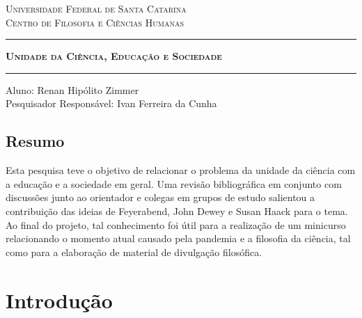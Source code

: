 \documentclass[12pt]{report}
\begin{document}
	
	\begin{center}
		\vspace*{-3cm}
		\textsc{Universidade Federal de Santa Catarina} \\
		\textsc{Centro de Filosofia e Ciências Humanas}
		
		\vspace{1cm}
		\rule{411pt}{1.3pt}
		\vspace{0.2cm}
		
		\Large \textbf{\textsc{Unidade da Ciência, Educação e Sociedade}}
		
		\rule{411pt}{1.3pt}
		\vspace{1cm}
		
		Aluno: Renan Hipólito Zimmer\\
		\vspace{0.5cm}
		Pesquisador Responsável: Ivan Ferreira da Cunha
		
		\vspace{1cm}
	\end{center}	
	
	\vspace{-0.5cm}
	\section*{Resumo}
		Esta pesquisa teve o objetivo de relacionar o problema da unidade da ciência com a educação e a sociedade em geral.
		Uma revisão bibliográfica em conjunto com discussões junto ao orientador e colegas em grupos de estudo salientou a contribuição das ideias de Feyerabend, John Dewey e Susan Haack para o tema.
		Ao final do projeto, tal conhecimento foi útil para a realização de um minicurso relacionando o momento atual causado pela pandemia e a filosofia da ciência, tal como para a elaboração de material de divulgação filosófica.
		
	\newpage
	\vspace*{-3cm}
	\onehalfspacing
	\chapter*{Introdução}
	
		\vspace{-0.75cm}
\end{document}
